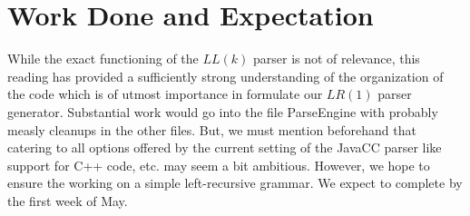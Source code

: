 \documentclass{article}
\begin{document}
\section{Work Done and Expectation}
While the exact functioning of the $LL(k)$ parser is not of relevance, this reading has provided a sufficiently strong understanding of the organization of the code which is of utmost importance in formulate our $LR(1)$ parser generator. Substantial work would go into the file ParseEngine with probably measly cleanups in the other files. But, we must mention beforehand that catering to all options offered by the current setting of the JavaCC parser like support for C++ code, etc. may seem a bit ambitious. However, we hope to ensure the working on a simple left-recursive grammar. We expect to complete by the first week of May. 
\end{document}
